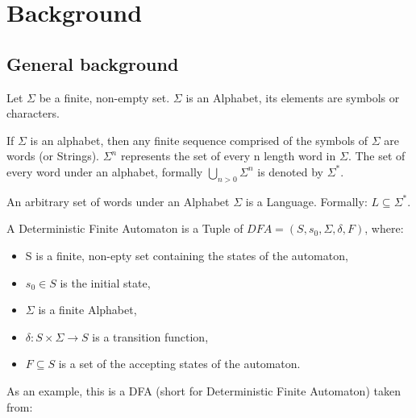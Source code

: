 \chapter{Background}

\section{General background}

\begin{definition}[Alphabet]
	Let $\Sigma$ be a finite, non-empty set. $\Sigma$ is an Alphabet, its elements are symbols or characters.
\end{definition}

\begin{definition}[Word]
	If $\Sigma$ is an alphabet, then any finite sequence comprised of the symbols of $\Sigma$ are words (or Strings). $\Sigma^{n}$ represents the set of every n length word in $\Sigma$. The set of every word under an alphabet, formally $\bigcup\limits_{n>0}^{} \Sigma^{n}$ is denoted by $\Sigma^{*}$.
\end{definition}

\begin{definition}
	An arbitrary set of words under an Alphabet $\Sigma$ is a Language. Formally: $L\subseteq\Sigma^{*}$.
\end{definition}

\begin{definition}
	A Deterministic Finite Automaton is a Tuple of $ DFA=(S,s_{0},\Sigma,\delta,F) $, where: 
	\begin{itemize}
		\item S is a finite, non-epty set containing the states of the automaton,
		\item $s_{0} \in S$ is the initial state,
		\item $\Sigma$ is a finite Alphabet,
		\item $\delta: S\times \Sigma \to S$ is a transition function,
		\item $F\subseteq S$ is a set of the accepting states of the automaton. 
	\end{itemize}
\end{definition}

\noindent As an example, this is a DFA (short for Deterministic Finite Automaton) taken from\cite{Steffen2011}: 

